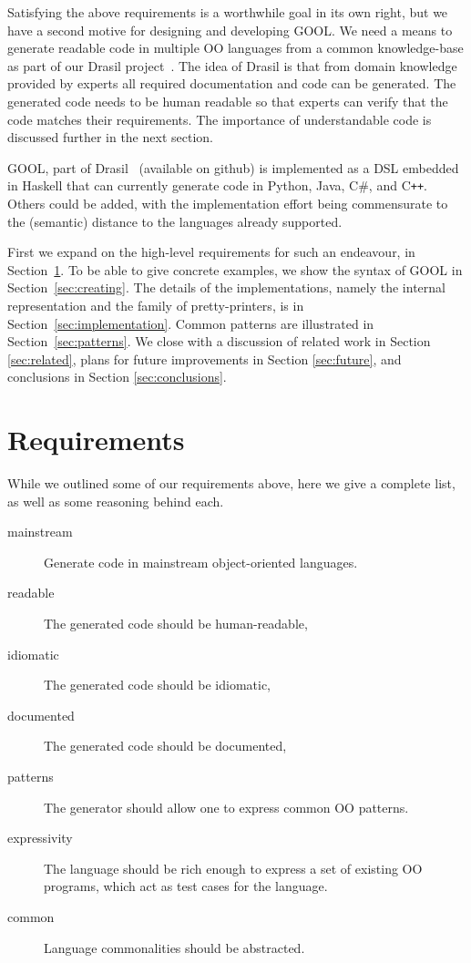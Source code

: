 \documentclass[sigplan,review,prologue,dvipsnames]{acmart}
\newcommand{\Csharp}{C\#}
\newcommand{\Cplusplus}{C\texttt{++}}
\begin{document}
Satisfying the above requirements is a worthwhile goal in its own right, but we
have a second motive for designing and developing GOOL.  We need a means to
generate readable code in multiple OO languages from a common knowledge-base as part of
our Drasil project~\cite{Drasil2019, SzymczakEtAl2016}.  The idea of Drasil is
that from domain knowledge provided by experts all required documentation
and code can be generated.  The generated code needs to be human readable so that
experts can verify that the code matches their requirements.  The importance of
understandable code is discussed further in the next section.

GOOL, part of Drasil~\cite{Drasil2019} (available on github)
is implemented as a DSL embedded in Haskell that
can currently generate code in Python, Java, \Csharp, and \Cplusplus.
Others could be added, with the implementation effort being commensurate to the
(semantic) distance to the languages already supported.

First we expand on the high-level requirements for such an endeavour, in
Section~\ref{sec:req}.  To be able to give concrete examples, we
show the syntax of GOOL in Section~\ref{sec:creating}. The details of
the implementations, namely the internal representation and the
family of pretty-printers, is in Section~\ref{sec:implementation}.
Common patterns are illustrated in Section~\ref{sec:patterns}.  We
close with a discussion of related work in Section \ref{sec:related}, plans for
future improvements in Section \ref{sec:future}, and conclusions in Section
\ref{sec:conclusions}.

\section{Requirements} \label{sec:req}

While we outlined some of our requirements above, here we give a
complete list, as well as some reasoning behind each.

\begin{description}
\item[mainstream] Generate code in mainstream object-oriented languages.
\item[readable] The generated code should be human-readable,
\item[idiomatic] The generated code should be idiomatic,
\item[documented] The generated code should be documented,
\item[patterns] The generator should allow one to express common OO patterns.
\item[expressivity] The language should be rich enough to express a
set of existing OO programs, which act as test cases for the language.
\item[common] Language commonalities should be abstracted.
\end{description}
\end{document}
